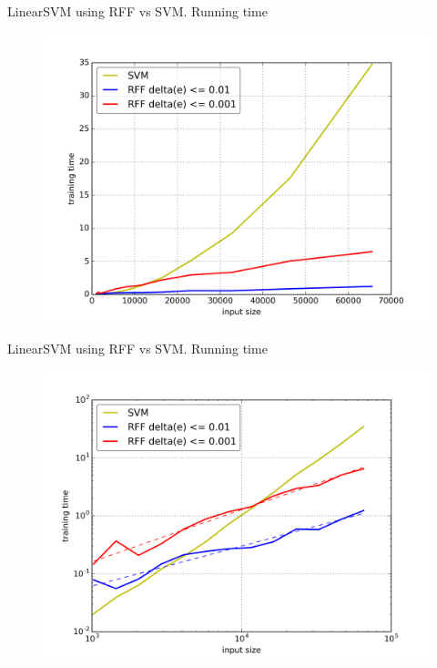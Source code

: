 \documentclass[unknownkeysallowed]{beamer}
\begin{document}
\begin{frame}{LinearSVM using RFF vs SVM. Running time}
\begin{figure}
\includegraphics[scale=0.45]{img/svm_tm_n10_N131072_k10--lin_}
\end{figure}
\end{frame}

\begin{frame}[noframenumbering]{LinearSVM using RFF vs SVM. Running time}
\begin{figure}
\includegraphics[scale=0.45]{img/svm_tm_n10_N131072_k10-lolo_}
\end{figure}
\end{frame}
\end{document}
